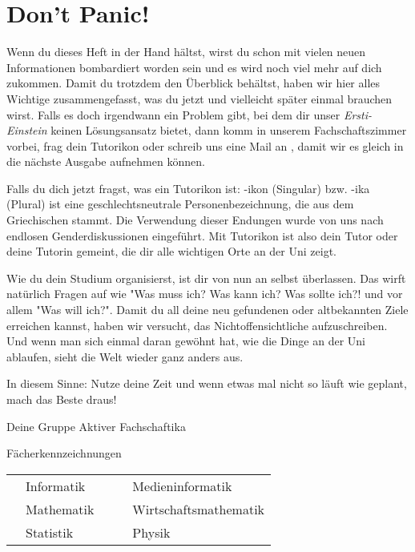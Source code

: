 %
%

\chapter{Don't Panic!}

Wenn du dieses Heft in der Hand hältst, wirst du schon mit vielen neuen Informationen bombardiert worden sein und es wird noch viel mehr auf dich zukommen. Damit du trotzdem den Überblick behältst, haben wir hier alles Wichtige zusammengefasst, was du jetzt und vielleicht später einmal brauchen wirst. Falls es doch irgendwann ein Problem gibt, bei dem dir unser \emph{Ersti-Einstein} keinen Lösungsansatz bietet, dann komm in unserem Fachschaftszimmer vorbei, frag dein Tutorikon oder schreib uns eine Mail an , damit wir es gleich in die nächste Ausgabe aufnehmen können. 

Falls du dich jetzt fragst, was ein Tutorikon ist: -ikon (Singular) bzw. -ika (Plural) ist eine geschlechtsneutrale Personenbezeichnung, die aus dem Griechischen stammt. Die Verwendung dieser Endungen wurde von uns nach endlosen Genderdiskussionen eingeführt. Mit Tutorikon ist also dein Tutor oder deine Tutorin gemeint, die dir alle wichtigen Orte an der Uni zeigt.

Wie du dein Studium organisierst, ist dir von nun an selbst überlassen. Das wirft natürlich Fragen auf wie "Was muss ich? Was kann ich? Was sollte ich?! und vor allem "Was will ich?". Damit du all deine neu gefundenen oder altbekannten Ziele erreichen kannst, haben wir versucht, das Nichtoffensichtliche aufzuschreiben. Und wenn man sich einmal daran gewöhnt hat, wie die Dinge an der Uni ablaufen, sieht die Welt wieder ganz anders aus.

In diesem Sinne: Nutze deine Zeit und wenn etwas mal nicht so läuft wie geplant, mach das Beste draus!

Deine Gruppe Aktiver Fachschaftika
\vfill

\begin{table*}
	\centering
	  Fächerkennzeichnungen
		\begin{tabular}{ l l c l l }
			\subjectI & Informatik &  & \subjectMI & Medieninformatik \\
			\subjectM & Mathematik &  & \subjectW  & Wirtschaftsmathematik \\
			\subjectS & Statistik  &  & \subjectP  & Physik \\
		\end{tabular}
\end{table*}